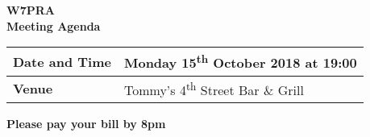 \documentclass[letter,11pt]{extarticle}
\begin{document}
	\thispagestyle{empty}
	
	\begin{center}
		\textbf{W7PRA\\Meeting Agenda}
		\vspace{0.33cm}
	\end{center}
	
	\begin{center}
		\begin{tabular}{| m{3.0cm} | m{7.5cm} |} \hline
			\textbf{Date and Time} & Monday 15\textsuperscript{th} October 2018 at 19:00 \\ \hline
			\textbf{Venue} & Tommy's 4\textsuperscript{th} Street Bar \& Grill \\ \hline
				\end{tabular}
	\end{center}
	
	\begin{center}
		\textbf{Please pay your bill by 8pm}
	\end{center}
	
\end{document}
